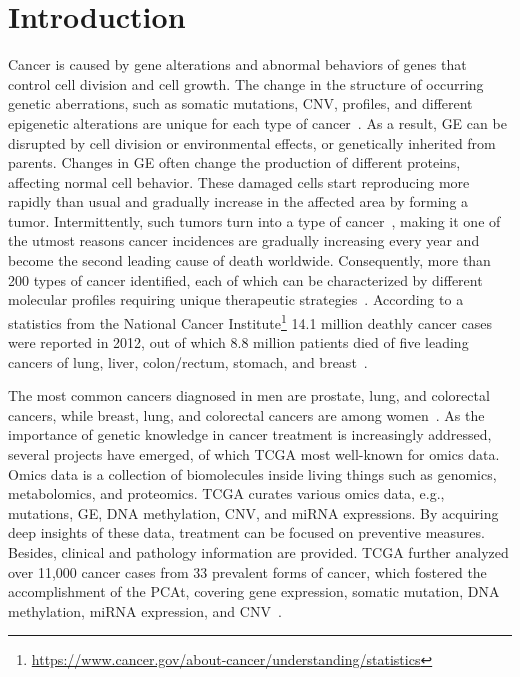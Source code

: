 \section{Introduction}\label{chapter_5:intro}
Cancer is caused by gene alterations and abnormal behaviors of genes that control cell division and cell growth. The change in the structure of occurring genetic aberrations, such as somatic mutations, CNV, profiles, and different epigenetic alterations are unique for each type of cancer~\cite{82Tomczak,19Cruz}. As a result, GE can be disrupted by cell division or environmental effects, or genetically inherited from parents. Changes in GE often change the production of different proteins, affecting normal cell behavior. These damaged cells start reproducing more rapidly than usual and gradually increase in the affected area by forming a tumor. Intermittently, such tumors turn into a type of cancer~\cite{zuo2019identification,24Podolsky}, making it one of the utmost reasons cancer incidences are gradually increasing every year and become the second leading cause of death worldwide. Consequently, more than 200 types of cancer identified, each of which can be characterized by different molecular profiles requiring unique therapeutic strategies~\cite{82Tomczak}. According to a statistics from the National Cancer Institute\footnote{\url{https://www.cancer.gov/about-cancer/understanding/statistics}} 14.1 million deathly cancer cases were reported in 2012, out of which 8.8 million patients died of five leading cancers of lung, liver, colon/rectum, stomach, and breast~\cite{zuo2019identification}. 

\hspace*{3.5mm}The most common cancers diagnosed in men are prostate, lung, and colorectal cancers, while breast, lung, and colorectal cancers are among women~\cite{li2017comprehensive}.
As the importance of genetic knowledge in cancer treatment is increasingly addressed, several projects have emerged, of which TCGA most well-known for omics data. Omics data is a collection of biomolecules inside living things such as genomics, metabolomics, and proteomics. TCGA curates various omics data, e.g., mutations, GE, DNA methylation, CNV, and miRNA expressions. By acquiring deep insights of these data, treatment can be focused on preventive measures. Besides, clinical and pathology information are provided. TCGA further analyzed over 11,000 cancer cases from 33 prevalent forms of cancer, which fostered the accomplishment of the PCAt, covering gene expression, somatic mutation, DNA methylation, miRNA expression, and CNV~\cite{lyu2018deep}. 

